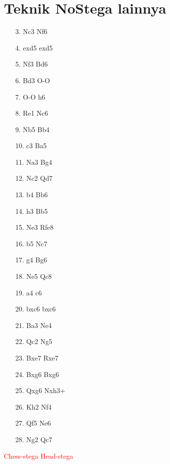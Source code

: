 \documentclass{article}
\begin{document}
\newpage


\section*{Teknik NoStega lainnya}

\vspace{94.45mm}

\begin{enumerate}
  \item[3.] Nc3 \quad Nf6
  \item[4.] exd5 \quad exd5
  \item[5.] Nf3 \quad Bd6
  \item[6.] Bd3 \quad O-O
  \item[7.] O-O \quad h6
  \item[8.] Re1 \quad Nc6
  \item[9.] Nb5 \quad Bb4
  \item[10.] c3 \quad Ba5
  \item[11.] Na3 \quad Bg4
  \item[12.] Nc2 \quad Qd7
  \item[13.] b4 \quad Bb6
  \item[14.] h3 \quad Bb5
  \item[15.] Ne3 \quad Rfe8
  \item[16.] b5 \quad Nc7
  \item[17.] g4 \quad Bg6
  \item[18.] Ne5 \quad Qc8
  \item[19.] a4 \quad c6
  \item[20.] bxc6 \quad bxc6
  \item[21.] Ba3 \quad Ne4
  \item[22.] Qc2 \quad Ng5
  \item[23.] Bxe7 \quad Rxe7
  \item[24.] Bxg6 \quad Bxg6
  \item[25.] Qxg6 \quad Nxh3+
  \item[26.] Kh2 \quad Nf4
  \item[27.] Qf5 \quad Ne6
  \item[28.] Ng2 \quad Qc7
\end{enumerate}

\vspace{10mm}

\begin{center}
\textcolor{red}{Chess-stega} \quad \quad \quad \quad \quad \quad \quad \textcolor{red}{Head-stega}
\end{center}
\end{document}
